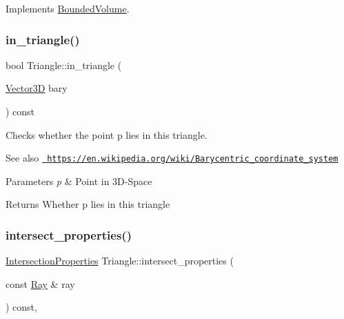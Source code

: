 Implements \mbox{\hyperlink{classBoundedVolume_a281168c4d827c38b46e639f6e4991a9e}{Bounded\+Volume}}.

\mbox{\label{classTriangle_a77b65e645ea99e309d6a8672e61d488d}} 
\subsubsection{\texorpdfstring{in\_triangle()}{in\_triangle()}}
{\footnotesize\ttfamily bool Triangle\+::in\+\_\+triangle (\begin{DoxyParamCaption}\item[{\mbox{\hyperlink{classVector3D}{Vector3D}}}]{bary }\end{DoxyParamCaption}) const\hspace{0.3cm}{\ttfamily [private]}}



Checks whether the point p lies in this triangle. 

\begin{DoxySeeAlso}{See also}
\href{https://en.wikipedia.org/wiki/Barycentric_coordinate_system}{\texttt{ https\+://en.\+wikipedia.\+org/wiki/\+Barycentric\+\_\+coordinate\+\_\+system}} 
\end{DoxySeeAlso}

\begin{DoxyParams}{Parameters}
{\em p} & Point in 3D-\/\+Space \\
\hline
\end{DoxyParams}
\begin{DoxyReturn}{Returns}
Whether p lies in this triangle 
\end{DoxyReturn}
\mbox{\label{classTriangle_abbca4150897005e47c87758833479c87}} 
\subsubsection{\texorpdfstring{intersect\_properties()}{intersect\_properties()}}
{\footnotesize\ttfamily \mbox{\hyperlink{classIntersectionProperties}{Intersection\+Properties}} Triangle\+::intersect\+\_\+properties (\begin{DoxyParamCaption}\item[{const \mbox{\hyperlink{classRay}{Ray}} \&}]{ray }\end{DoxyParamCaption}) const\hspace{0.3cm}{\ttfamily [override]}, {\ttfamily [virtual]}}



